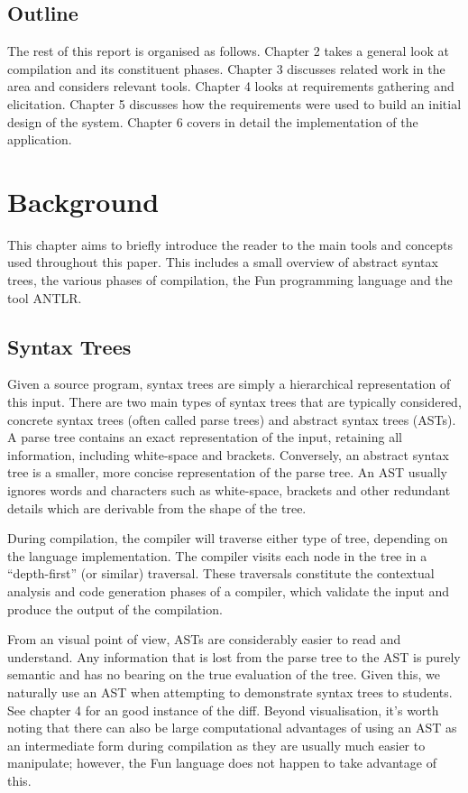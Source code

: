 \documentclass{l4proj}
\begin{document}
\section{Outline}
The rest of this report is organised as follows. Chapter 2 takes a general look at compilation and its constituent phases. Chapter 3 discusses related work in the area and considers relevant tools. Chapter 4 looks at requirements gathering and elicitation. Chapter 5 discusses how the requirements were used to build an initial design of the system. Chapter 6 covers in detail the implementation of the application.

\chapter{Background}
This chapter aims to briefly introduce the reader to the main tools and concepts used throughout this paper. This includes a small overview of abstract syntax trees, the various phases of compilation, the Fun programming language and the tool ANTLR.

\section{Syntax Trees}
Given a source program, syntax trees are simply a hierarchical representation of this input. There are two main types of syntax trees that are typically considered, concrete syntax trees (often called parse trees) and abstract syntax trees (ASTs). A parse tree contains an exact representation of the input, retaining all information, including white-space and brackets. Conversely, an abstract syntax tree is a smaller, more concise representation of the parse tree. An AST usually ignores words and characters such as white-space, brackets and other redundant details which are derivable from the shape of the tree. 

During compilation, the compiler will traverse either type of tree, depending on the language implementation. The compiler visits each node in the tree in a ``depth-first'' (or similar) traversal. These traversals constitute the contextual analysis and code generation phases of a compiler, which validate the input and produce the output of the compilation. 

From an visual point of view, ASTs are considerably easier to read and understand. Any information that is lost from the parse tree to the AST is purely semantic and has no bearing on the true evaluation of the tree. Given this, we naturally use an AST when attempting to demonstrate syntax trees to students. See chapter 4 for an good instance of the diff. Beyond visualisation, it's worth noting that there can  also be large computational advantages of using an AST as an intermediate form during compilation as they are usually much easier to manipulate; however, the Fun language does not happen to take advantage of this. 
\end{document}
